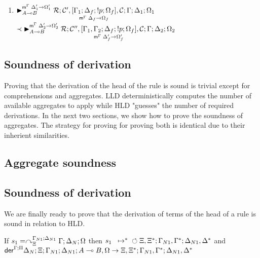 \begin{enumerate}[leftmargin=*]
   \item $\matstate{A \lolli B}{\rulestk}{\lstack{C'},
      \pframe{\Gamma_1}{\Delta_f}{\bang p}{\Omega_f}{\Delta_f}{\Omega_f},
   \lstack{C}}{\Gamma}{\Delta_1}{\Omega_1}{\Delta'_1 \rightarrow \Omega'_1}$\\
   \hspace*{1cm} $\prec \matstate{A \lolli B}{\rulestk}{\lstack{C''},
      \pframe{\Gamma_1, \Gamma_2}{\Delta_f}{\bang p}{\Omega_f}{\Delta'_f}{\Omega'_f},
      \lstack{C}}{\Gamma}{\Delta_2}{\Omega_2}{\Delta'_2 \rightarrow \Omega'_2}$

\end{enumerate}

\subsection{Soundness of derivation}

Proving that the derivation of the head of the rule is sound is trivial except
for comprehensions and aggregates. LLD deterministically computes the number of
available aggregates to apply while HLD "guesses" the number of required
derivations.  In the next two sections, we show how to prove the soundness of
aggregates. The strategy for proving for proving both is identical due to their
inherient similarities.

\subsection{Aggregate soundness}



\subsection{Soundness of derivation}

We are finally ready to prove that the derivation of terms of the head of a rule
is sound in relation to HLD.

\begin{lemma}\label{thm:head_derivation_soundness}
If $s_1 = \derstatex{\Gamma}{\Delta_N}{\Xi}{\Gamma_{N1}}{\Delta_{N1}}{\Omega}$
then $\transs{s_1}{\finalstate{\Xi, \Xi^{*}}{\Gamma_{N1},
      \Gamma^{*}}{\Delta_{N1}, \Delta^{*}}}$ and
$\dz{\Gamma}{\Pi}{\Delta_N}{\Xi}{\Gamma_{N1}}{\Delta_{N1}}{A \lolli B,
   \Omega}{\Xi, \Xi^{*}; \Gamma_{N1}, \Gamma^{*}; \Delta_{N1}, \Delta^{*}}$
\end{lemma}

